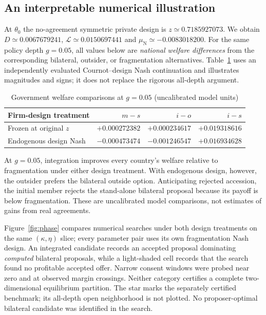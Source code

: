\documentclass[11pt,a4paper]{article}
\theoremstyle{remark}\newtheorem{remark}[theorem]{Remark}
\newcommand{\N}{\mathrm{N}}\newcommand{\F}{\mathrm{F}}
\newcommand{\loss}{\mathcal L}\newcommand{\vect}[1]{\boldsymbol{#1}}
\begin{document}
\subsection{An interpretable numerical illustration}
At $\theta_0$ the no-agreement symmetric private design is $z\simeq0.7185927073$. We obtain $D\simeq0.0067679241$, $\loss\simeq0.0150697441$ and $\mu_{\N}\simeq-0.0083018200$. For the same policy depth $g=0.05$, all values below are \emph{national welfare differences} from the corresponding bilateral, outsider, or fragmentation alternatives. Table~\ref{tab:effects} uses an independently evaluated Cournot--design Nash continuation and illustrates magnitudes and signs; it does not replace the rigorous all-depth argument.
\begin{table}[H]
\centering\small
\caption{Government welfare comparisons at $g=0.05$ (uncalibrated model units)}\label{tab:effects}
\begin{tabular}{lrrr}
\toprule
Firm-design treatment&$m-s$&$i-o$&$i-s$\\
\midrule
Frozen at original $z$&$+0.000272382$&$+0.000234617$&$+0.019318616$\\
Endogenous design Nash&$-0.000473474$&$-0.001246547$&$+0.016934628$\\
\bottomrule
\end{tabular}
\end{table}
At $g=0.05$, integration improves every country's welfare relative to fragmentation under either design treatment. With endogenous design, however, the outsider prefers the bilateral outside option. Anticipating rejected accession, the initial member rejects the stand-alone bilateral proposal because its payoff is below fragmentation. These are uncalibrated model comparisons, not estimates of gains from real agreements.

Figure~\ref{fig:phase} compares numerical searches under both design treatments on the same $(\kappa,\eta)$ slice; every parameter pair uses its own fragmentation Nash design. An integrated candidate records an accepted proposal dominating \emph{computed} bilateral proposals, while a light-shaded cell records that the search found no profitable accepted offer. Narrow consent windows were probed near zero and at observed margin crossings. Neither category certifies a complete two-dimensional equilibrium partition. The star marks the separately certified benchmark; its all-depth open neighborhood is not plotted. No proposer-optimal bilateral candidate was identified in the search.
\end{document}

